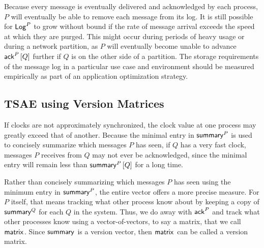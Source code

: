 \documentclass[]             %
{NASA}                       %
\theoremstyle{definition}
\begin{document}
Because every message is eventually delivered and acknowledged by each
process, $P$ will eventually be able to remove each message from its
log. It is still possible for $\mathsf{Log}^{P}$ to grow without bound if the
rate of message arrival exceeds the speed at which they are
purged. This might occur during periods of heavy usage or during a
network partition, as $P$ will eventually become unable to advance
$\mathsf{ack}^{P}\left[Q\right]$ further if $Q$ is on the other side of a partition. The
storage requirements of the message log in a particular use case and
environment should be measured empirically as part of an application
optimization strategy.

\subsection{TSAE using Version Matrices}
\label{ssec:tsae-unsynchronized}
If clocks are not approximately synchronized, the clock value at one
process may greatly exceed that of another. Because the minimal entry
in $\mathsf{summary}^{P}$ is used to concisely summarize which messages $P$
has seen, if $Q$ has a very fast clock, messages $P$ receives from $Q$
may not ever be acknowledged, since the minimal entry will remain less
than $\mathsf{summary}^{P}\left[Q\right]$ for a long time.

Rather than concisely summarizing which messages $P$ has seen using
the minimum entry in $\mathsf{summary}^{P}$, the entire vector offers a more
precise measure. For $P$ itself, that means tracking what other
process know about by keeping a copy of $\mathsf{summary}^{Q}$ for each $Q$
in the system. Thus, we do away with $\mathsf{ack}^{P}$ and track what other
processes know using a vector-of-vectors, to say a matrix, that we
call $\mathsf{matrix}^{}$. Since $\mathsf{summary}^{}$ is a version vector, then
$\mathsf{matrix}^{}$ can be called a version matrix.
\end{document}
